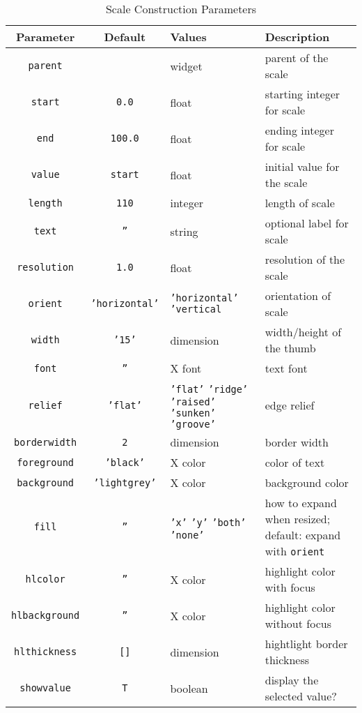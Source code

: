 \begin{table}[tbh]
{\small
\begin{center}
\begin{tabular}{|c|c|p{1.6in}|p{1.5in}|}
\hline
Parameter & Default & Values & Description \\
\hline
\hline
{\tt parent}		& 		& widget & parent of the scale \\ \hline
{\tt start}		& {\tt 0.0}	& float & starting integer for scale \\ \hline
{\tt end}		& {\tt 100.0}	& float & ending integer for scale \\ \hline
{\tt value}		& {\tt start}	& float & initial value for the scale \\ \hline
{\tt length}		& {\tt 110}	& integer & length of scale \\ \hline
{\tt text}		& {\tt ''}	& string & optional label for scale \\ \hline
{\tt resolution}	& {\tt 1.0}	& float & resolution of the scale \\ \hline
{\tt orient}		& {\tt 'horizontal'}& {\tt 'horizontal'} {\tt 'vertical} & orientation of scale \\ \hline
{\tt width}		& {\tt '15'}    & dimension & width/height of the thumb \\ \hline
{\tt font}		& {\tt ''}	& X font & text font \\ \hline
{\tt relief}		& {\tt 'flat'}& {\tt 'flat'} {\tt 'ridge'} {\tt 'raised'} {\tt 'sunken'} {\tt 'groove'} & edge relief \\ \hline
{\tt borderwidth}	& {\tt 2}	& dimension & border width \\ \hline
{\tt foreground}	& {\tt 'black'}	& X color & color of text \\ \hline
{\tt background}	& {\tt 'lightgrey'}& X color & background color \\ \hline
{\tt fill}		& {\tt ''}	& {\tt 'x'} {\tt 'y'} {\tt 'both'} {\tt 'none'} & how to expand when resized; default: expand with {\tt orient} \\ \hline
{\tt hlcolor}		& {\tt ''}	& X color & highlight color with focus \\ \hline
{\tt hlbackground}	& {\tt ''}	& X color & highlight color without focus \\ \hline
{\tt hlthickness}	& {\tt []}	& dimension & hightlight border thickness \\ \hline
{\tt showvalue}		& {\tt T}	& boolean & display the selected value? \\ \hline
\end{tabular}
\end{center}
}
\caption{ Scale Construction Parameters }
\label{tkscale-params}
\end{table}

